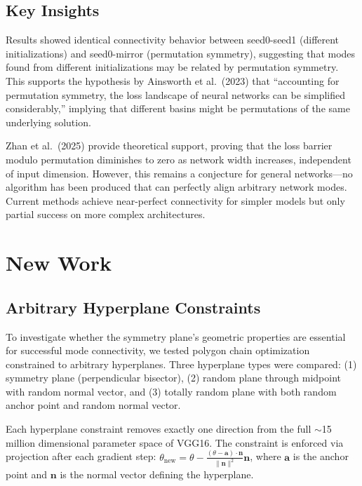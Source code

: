 \documentclass[11pt,a4paper]{article}
\begin{document}
\subsection{Key Insights}
Results showed identical connectivity behavior between seed0-seed1 (different initializations) and seed0-mirror (permutation symmetry), suggesting that modes found from different initializations may be related by permutation symmetry. This supports the hypothesis by Ainsworth et al.\ (2023) that ``accounting for permutation symmetry, the loss landscape of neural networks can be simplified considerably,'' implying that different basins might be permutations of the same underlying solution. 

Zhan et al.\ (2025) provide theoretical support, proving that the loss barrier modulo permutation diminishes to zero as network width increases, independent of input dimension. However, this remains a conjecture for general networks---no algorithm has been produced that can perfectly align arbitrary network modes. Current methods achieve near-perfect connectivity for simpler models but only partial success on more complex architectures.

\section{New Work}

\subsection{Arbitrary Hyperplane Constraints}

To investigate whether the symmetry plane's geometric properties are essential for successful mode connectivity, we tested polygon chain optimization constrained to arbitrary hyperplanes. Three hyperplane types were compared: (1) symmetry plane (perpendicular bisector), (2) random plane through midpoint with random normal vector, and (3) totally random plane with both random anchor point and random normal vector.

Each hyperplane constraint removes exactly one direction from the full $\sim$15 million dimensional parameter space of VGG16. The constraint is enforced via projection after each gradient step: $\theta_{\text{new}} = \theta - \frac{(\theta - \mathbf{a}) \cdot \mathbf{n}}{\|\mathbf{n}\|^2} \mathbf{n}$, where $\mathbf{a}$ is the anchor point and $\mathbf{n}$ is the normal vector defining the hyperplane.
\end{document}
